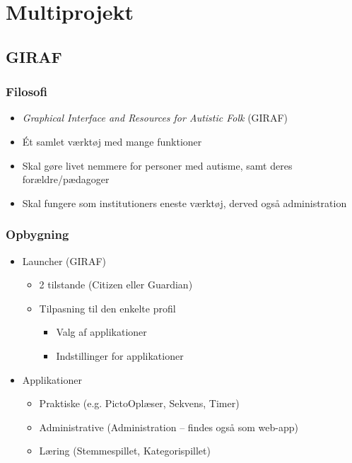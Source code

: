 \section{Multiprojekt}

\subsection{GIRAF}

\begin{frame}
\frametitle{Filosofi}

\begin{itemize}
\item \textit{Graphical Interface and Resources for Autistic Folk} (GIRAF)
\item Ét samlet værktøj med mange funktioner
\item Skal gøre livet nemmere for personer med autisme, samt deres forældre/pædagoger
\item Skal fungere som institutioners eneste værktøj, derved også administration
\end{itemize}

\end{frame}

\begin{frame}
\frametitle{Opbygning}

\begin{itemize}
\item Launcher (GIRAF)
\begin{itemize}
\item 2 tilstande (Citizen eller Guardian)
\item Tilpasning til den enkelte profil
\begin{itemize}
\item Valg af applikationer
\item Indstillinger for applikationer
\end{itemize}
\end{itemize}
\item Applikationer
\begin{itemize}
\item Praktiske (e.g. PictoOplæser, Sekvens, Timer)
\item Administrative (Administration -- findes også som web-app)
\item Læring (Stemmespillet, Kategorispillet)
\end{itemize}
\end{itemize}

\end{frame}

